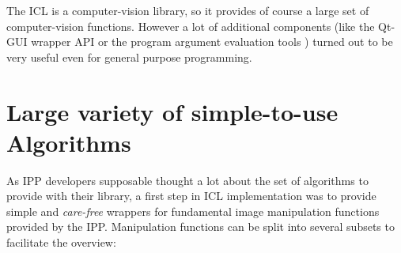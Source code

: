  The ICL is a computer-vision library, so it provides of course a large set of computer-vision functions. However a lot of additional components (like the Qt-GUI wrapper API  or the program argument evaluation tools ) turned out to be very useful even for general purpose programming. 

\section{Large variety of simple-to-use Algorithms}
As IPP developers supposable thought a lot about the set of algorithms to provide with their library, a first step in ICL implementation was to provide simple and \emph{care-free} wrappers for fundamental image manipulation functions provided by the IPP. Manipulation functions can be split into several subsets to facilitate the overview:
